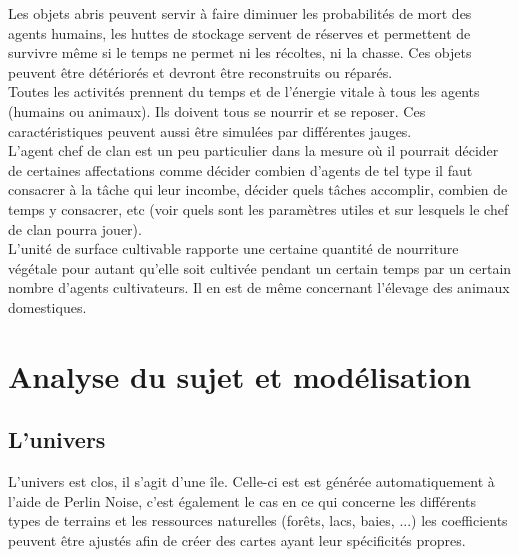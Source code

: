 \documentclass[12pt]{article}
\begin{document}
Les objets abris peuvent servir à faire diminuer les probabilités de mort des 
agents humains, les huttes de stockage servent de réserves et permettent de 
survivre même si le temps ne permet ni les récoltes, ni la chasse. Ces objets 
peuvent être détériorés et devront être reconstruits ou réparés.\\

Toutes les activités prennent du temps et de l'énergie vitale à tous les agents 
(humains ou animaux). Ils doivent tous se nourrir et se reposer. Ces 
caractéristiques peuvent aussi être simulées par différentes jauges.\\

L'agent chef de clan est un peu particulier dans la mesure où il pourrait 
décider de certaines affectations comme décider combien d'agents de tel type 
il faut consacrer à la tâche qui leur incombe, décider quels tâches accomplir, 
combien de temps y consacrer, etc (voir quels sont les paramètres utiles et 
sur lesquels le chef de clan pourra jouer).\\

L'unité de surface cultivable rapporte une certaine quantité de nourriture 
végétale pour autant qu'elle soit cultivée pendant un certain temps par un 
certain nombre d'agents cultivateurs. Il en est de même concernant l'élevage 
des animaux domestiques.\\


\section{Analyse du sujet et modélisation}

	\subsection{L'univers}

L'univers est clos, il s'agit d'une île. Celle-ci est est générée 
automatiquement à l'aide de Perlin Noise, c'est également le cas en ce qui 
concerne les différents types de terrains et les ressources naturelles 
(forêts, lacs, baies, ...) les coefficients peuvent être ajustés afin de créer 
des cartes ayant leur spécificités propres.\\
\end{document}
